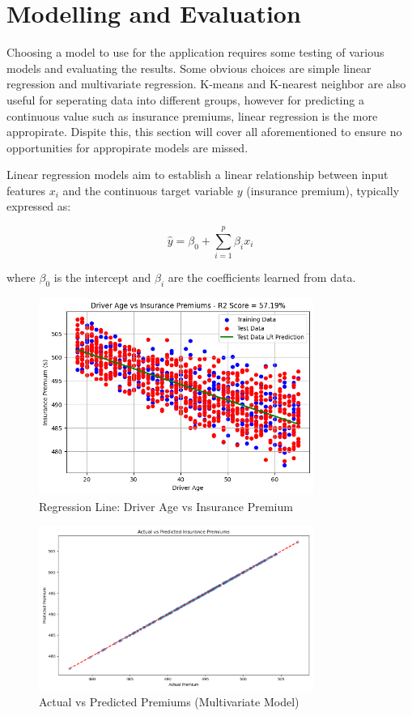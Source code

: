 \documentclass{article}
\begin{document}
\newpage
\section{Modelling and Evaluation}

Choosing a model to use for the application requires some testing of various models and evaluating the results. Some obvious choices are simple linear regression and multivariate regression. K-means and K-nearest neighbor are also useful for seperating data into different groups, however for predicting a continuous value such as insurance premiums, linear regression is the more appropirate. Dispite this, this section will cover all aforementioned to ensure no opportunities for appropirate models are missed.

Linear regression models aim to establish a linear relationship between input features $x_i$ and the continuous target variable $y$ (insurance premium), typically expressed as:

$$
\hat{y} = \beta_0 + \sum_{i=1}^p \beta_i x_i
$$

where $\beta_0$ is the intercept and $\beta_i$ are the coefficients learned from data\cite{hastie_09_elements-of.statistical-learning}.



\begin{figure}[h]
\centering
\includegraphics[width=0.8\textwidth]{age_insurance_LR.png}
\caption{Regression Line: Driver Age vs Insurance Premium}\label{fig:regression_age}
\end{figure}

\begin{figure}[h]
\centering
\includegraphics[width=0.8\textwidth]{actual_vs_predicted.png}
\caption{Actual vs Predicted Premiums (Multivariate Model)}\label{fig:multivariate_regression}
\end{figure}
\end{document}

